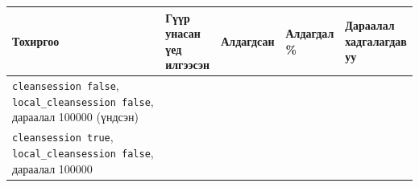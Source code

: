 \begingroup\scriptsize\begin{longtable}[]{@{}lllll@{}}
\toprule
\begin{minipage}[b]{0.17\columnwidth}\raggedright
Тохиргоо\strut
\end{minipage} & \begin{minipage}[b]{0.17\columnwidth}\raggedright
Гүүр унасан үед илгээсэн\strut
\end{minipage} & \begin{minipage}[b]{0.17\columnwidth}\raggedright
Алдагдсан\strut
\end{minipage} & \begin{minipage}[b]{0.17\columnwidth}\raggedright
Алдагдал \%\strut
\end{minipage} & \begin{minipage}[b]{0.17\columnwidth}\raggedright
Дараалал хадгалагдав уу\strut
\end{minipage}\tabularnewline
\midrule
\endhead
\begin{minipage}[t]{0.17\columnwidth}\raggedright
\texttt{cleansession\ false}, \texttt{local\_\allowbreak{}cleansession\ false}, дараалал 100000 (үндсэн)\strut
\end{minipage} & \begin{minipage}[t]{0.17\columnwidth}\raggedright
\strut
\end{minipage} & \begin{minipage}[t]{0.17\columnwidth}\raggedright
\strut
\end{minipage} & \begin{minipage}[t]{0.17\columnwidth}\raggedright
\strut
\end{minipage} & \begin{minipage}[t]{0.17\columnwidth}\raggedright
\strut
\end{minipage}\tabularnewline
\begin{minipage}[t]{0.17\columnwidth}\raggedright
\texttt{cleansession\ true}, \texttt{local\_\allowbreak{}cleansession\ false}, дараалал 100000\strut
\end{minipage} & \begin{minipage}[t]{0.17\columnwidth}\raggedright
\strut
\end{minipage} & \begin{minipage}[t]{0.17\columnwidth}\raggedright
\strut
\end{minipage} & \begin{minipage}[t]{0.17\columnwidth}\raggedright
\strut
\end{minipage} & \begin{minipage}[t]{0.17\columnwidth}\raggedright

\end{minipage}
\end{longtable}
